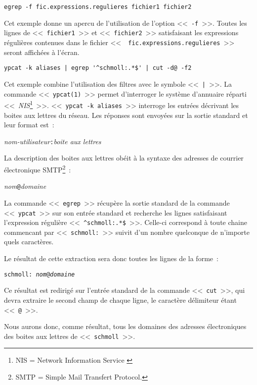 \begin{example}
\begin{verbatim}
egrep -f fic.expressions.regulieres fichier1 fichier2
\end{verbatim}
Cet exemple donne un apercu de l'utilisation de l'option <<~{\tt -f}~>>.
Toutes les lignes de <<~{\tt fichier1}~>> et <<~{\tt fichier2}~>>
satisfaisant les expressions r{\'e}guli{\`e}res contenues dans le fichier <<~{\tt
fic.expressions.regulieres}~>> seront affich{\'e}es {\`a} l'{\'e}cran.
\end{example}

\begin{example}
\begin{verbatim}
ypcat -k aliases | egrep '^schmoll:.*$' | cut -d@ -f2
\end{verbatim}
\vspace{2ex}
Cet exemple combine l'utilisation des filtres avec le symbole <<~\verb=|=~>>.
La commande <<~{\tt ypcat(1)}~>> permet d'interroger le syst{\`e}me d'annuaire
r{\'e}parti <<~{\sl NIS}\footnote{NIS = Network Information Service
\cite{nfs-nis-automnt}}~>>. <<~{\tt ypcat -k aliases}~>> interroge les
entr{\'e}es d{\'e}crivant les boites aux lettres du r{\'e}seau. Les r{\'e}ponses sont envoy{\'e}es
sur la sortie standard et leur format est~:\\[1ex]
\centerline{{\sl nom-utilisateur}{\tt :}{\sl boite aux lettres}}

\vspace{2ex}
La description des boites aux lettres ob{\'e}it {\`a} la syntaxe des adresses
de courrier {\'e}lectronique SMTP\footnote{SMTP = Simple Mail Transfert
Protocol.}~:\\[1ex]
\centerline{{\sl nom}{\tt @}{\sl domaine}}

\vspace{2ex}
La commande <<~{\tt egrep}~>> r{\'e}cup{\`e}re la sortie standard de la commande
<<~{\tt ypcat}~>> sur son entr{\'e}e standard et recherche les lignes
satisfaisant l'expression r{\'e}guli{\`e}re <<~\verb=^schmoll:.*$=~>>. Celle-ci
correspond {\`a} toute chaine commencant par <<~{\tt schmoll:}~>> suivit
d'un nombre quelconque de n'importe quels caract{\`e}res.

Le r{\'e}sultat de cette extraction sera donc toutes les lignes de la
forme~:\\[1ex]
\centerline{{\tt schmoll: {\sl nom}@{\sl domaine}}}

\vspace{2ex}
Ce r{\'e}sultat est redirig{\'e} sur l'entr{\'e}e standard de la commande <<~{\tt cut}~>>,
qui devra extraire le second champ de chaque ligne, le caract{\`e}re d{\'e}limiteur
{\'e}tant <<~{\tt @}~>>.

Nous aurons donc, comme r{\'e}sultat, tous les domaines des adresses
{\'e}lectroniques des boites aux lettres de <<~{\tt schmoll}~>>.
\end{example}

